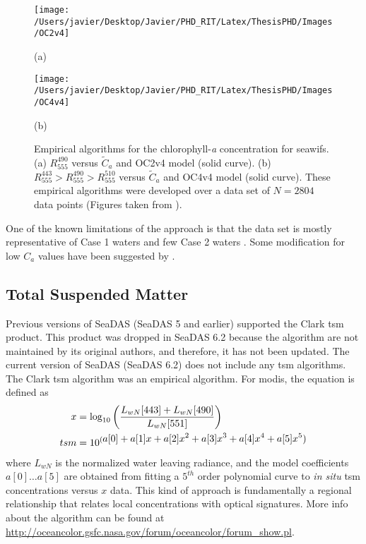 \begin{figure}[htb]
  \begin{minipage}[c]{0.48\linewidth}
    \centering
      \texttt{[image: /Users/javier/Desktop/Javier/PHD\_RIT/Latex/ThesisPHD/Images/OC2v4]}  
    \centerline{(a)}\medskip
  \end{minipage}
  \hfill
  \begin{minipage}[d]{0.48\linewidth}
    \centering
      \texttt{[image: /Users/javier/Desktop/Javier/PHD\_RIT/Latex/ThesisPHD/Images/OC4v4]}
    \centerline{(b)}\medskip
  \end{minipage}
  \caption{Empirical algorithms for the chlorophyll-{\it a} concentration for \gls{seawifs}. (a) $R_{555}^{490}$ versus $\tilde{C}_a$ and OC2v4 model (solid curve). (b) $R_{555}^{443}>R_{555}^{490}>R_{555}^{510}$ versus $\tilde{C}_a$ and OC4v4 model (solid curve). These empirical algorithms were developed over a data set of $N=2804$ data points (Figures taken from \citet{OReilly2000}). \label{fig:chlemp} } 
\end{figure}

One of the known limitations of the approach is that the data set is mostly representative of Case 1 waters and few Case 2 waters \citep{OReilly2000}. Some modification for low $C_a$ values have been suggested by \citet{Hu:2012fv}.
\subsection{Total Suspended Matter}

Previous versions of SeaDAS (SeaDAS 5 and earlier) supported the Clark \gls{tsm} product. This product was dropped in SeaDAS 6.2 because the algorithm are not maintained by its original authors, and therefore, it has not been updated. The current version of SeaDAS (SeaDAS 6.2) does not include any \gls{tsm} algorithms. The Clark \gls{tsm} algorithm was an empirical algorithm. For \gls{modis}, the equation is defined as
\begin{align}
  x   &= \log_{10}\left(\frac{L_{wN}[443]+L_{wN}[490]}{L_{wN}[551]}\right)\notag \\
  tsm &= 10^{(\displaystyle a[0] + a[1]x + a[2]x^2 + a[3]x^3 + a[4]x^4 + a[5]x^5)}
\end{align}
\noindent where $L_{wN}$ is the normalized water leaving radiance, and the model coefficients $a[0]\dots a[5]$ are obtained from fitting a $5^{th}$ order polynomial curve to {\it in situ} \gls{tsm} concentrations versus $x$ data. This kind of approach is fundamentally a regional relationship that relates local concentrations with optical signatures. More info about the algorithm can be found at \url{http://oceancolor.gsfc.nasa.gov/forum/oceancolor/forum_show.pl}.
